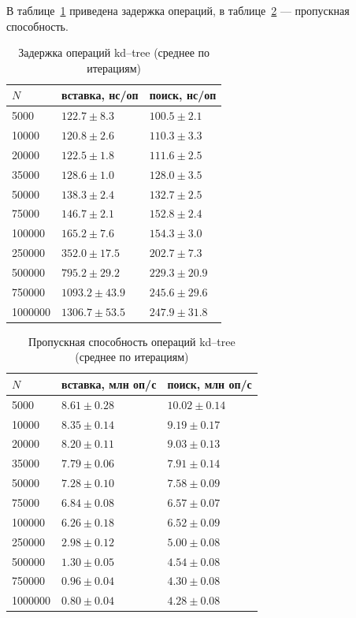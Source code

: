 \documentclass{itmo}
\begin{document}
В таблице~\ref{tab:kdtree-latency} приведена задержка операций, в таблице~\ref{tab:kdtree-throughput} --- пропускная способность.
\begin{table}[H]
	\centering
	\caption{Задержка операций kd--tree (среднее по итерациям)}
	\label{tab:kdtree-latency}
	\begin{tabularx}{\textwidth}{|l|X|X|}
		\toprule
		$N$ & вставка, нс/оп & поиск, нс/оп \\
		\midrule
		5000 & $122.7 \pm 8.3$ & $100.5 \pm 2.1$ \\
		10000 & $120.8 \pm 2.6$ & $110.3 \pm 3.3$ \\
		20000 & $122.5 \pm 1.8$ & $111.6 \pm 2.5$ \\
		35000 & $128.6 \pm 1.0$ & $128.0 \pm 3.5$ \\
		50000 & $138.3 \pm 2.4$ & $132.7 \pm 2.5$ \\
		75000 & $146.7 \pm 2.1$ & $152.8 \pm 2.4$ \\
		100000 & $165.2 \pm 7.6$ & $154.3 \pm 3.0$ \\
		250000 & $352.0 \pm 17.5$ & $202.7 \pm 7.3$ \\
		500000 & $795.2 \pm 29.2$ & $229.3 \pm 20.9$ \\
		750000 & $1093.2 \pm 43.9$ & $245.6 \pm 29.6$ \\
		1000000 & $1306.7 \pm 53.5$ & $247.9 \pm 31.8$ \\
		\bottomrule
	\end{tabularx}
\end{table}

\begin{table}[H]
	\centering
	\caption{Пропускная способность операций kd--tree (среднее по итерациям)}
	\label{tab:kdtree-throughput}
	\begin{tabularx}{\textwidth}{|l|X|X|}
		\toprule
		$N$ & вставка, млн оп/с & поиск, млн оп/с \\
		\midrule
		5000 & $8.61 \pm 0.28$ & $10.02 \pm 0.14$ \\
		10000 & $8.35 \pm 0.14$ & $9.19 \pm 0.17$ \\
		20000 & $8.20 \pm 0.11$ & $9.03 \pm 0.13$ \\
		35000 & $7.79 \pm 0.06$ & $7.91 \pm 0.14$ \\
		50000 & $7.28 \pm 0.10$ & $7.58 \pm 0.09$ \\
		75000 & $6.84 \pm 0.08$ & $6.57 \pm 0.07$ \\
		100000 & $6.26 \pm 0.18$ & $6.52 \pm 0.09$ \\
		250000 & $2.98 \pm 0.12$ & $5.00 \pm 0.08$ \\
		500000 & $1.30 \pm 0.05$ & $4.54 \pm 0.08$ \\
		750000 & $0.96 \pm 0.04$ & $4.30 \pm 0.08$ \\
		1000000 & $0.80 \pm 0.04$ & $4.28 \pm 0.08$ \\
		\bottomrule
	\end{tabularx}
\end{table}
\end{document}
